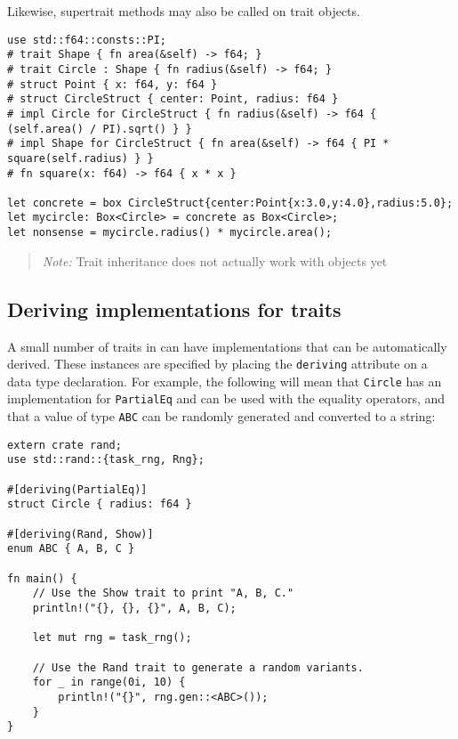 \documentclass[]{article}
\begin{document}
Likewise, supertrait methods may also be called on trait objects.

\begin{verbatim}
use std::f64::consts::PI;
# trait Shape { fn area(&self) -> f64; }
# trait Circle : Shape { fn radius(&self) -> f64; }
# struct Point { x: f64, y: f64 }
# struct CircleStruct { center: Point, radius: f64 }
# impl Circle for CircleStruct { fn radius(&self) -> f64 { (self.area() / PI).sqrt() } }
# impl Shape for CircleStruct { fn area(&self) -> f64 { PI * square(self.radius) } }
# fn square(x: f64) -> f64 { x * x }

let concrete = box CircleStruct{center:Point{x:3.0,y:4.0},radius:5.0};
let mycircle: Box<Circle> = concrete as Box<Circle>;
let nonsense = mycircle.radius() * mycircle.area();
\end{verbatim}

\begin{quote}
\emph{Note:} Trait inheritance does not actually work with objects yet
\end{quote}

\subsection{Deriving implementations for
traits}\label{deriving-implementations-for-traits}

A small number of traits in can have implementations that can be
automatically derived. These instances are specified by placing the
\texttt{deriving} attribute on a data type declaration. For example, the
following will mean that \texttt{Circle} has an implementation for
\texttt{PartialEq} and can be used with the equality operators, and that
a value of type \texttt{ABC} can be randomly generated and converted to
a string:

\begin{verbatim}
extern crate rand;
use std::rand::{task_rng, Rng};

#[deriving(PartialEq)]
struct Circle { radius: f64 }

#[deriving(Rand, Show)]
enum ABC { A, B, C }

fn main() {
    // Use the Show trait to print "A, B, C."
    println!("{}, {}, {}", A, B, C);

    let mut rng = task_rng();

    // Use the Rand trait to generate a random variants.
    for _ in range(0i, 10) {
        println!("{}", rng.gen::<ABC>());
    }
}
\end{verbatim}
\end{document}
